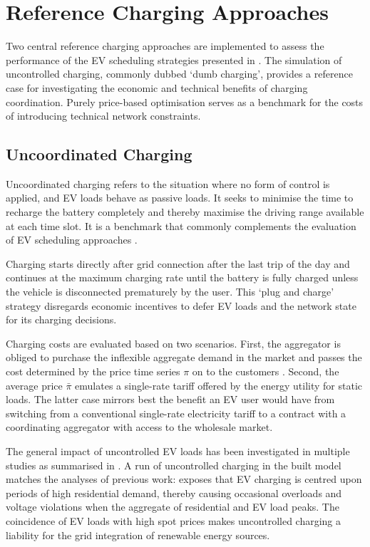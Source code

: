 \section{Reference Charging Approaches}
\label{sec:rc}

Two central reference charging approaches are implemented to assess the performance of the EV scheduling strategies presented in . The simulation of uncontrolled charging, commonly dubbed `dumb charging', provides a reference case for investigating the economic and technical benefits of charging coordination. Purely price-based optimisation serves as a benchmark for the costs of introducing technical network constraints.

\subsection{Uncoordinated Charging}
\label{sec:dumbcharging}

Uncoordinated charging refers to the situation where no form of control is applied, and EV loads behave as passive loads. It seeks to minimise the time to recharge the battery completely and thereby maximise the driving range available at each time slot. It is a benchmark that commonly complements the evaluation of EV scheduling approaches \cite{GonzalezVaya2015a, Galus2011, Papadopoulos2012, Wu2013, Schuller2013}.

Charging starts directly after grid connection after the last trip of the day and continues at the maximum charging rate until the battery is fully charged unless the vehicle is disconnected prematurely by the user. This `plug and charge' strategy disregards economic incentives to defer EV loads and the network state for its charging decisions.

Charging costs are evaluated based on two scenarios. First, the aggregator is obliged to purchase the inflexible aggregate demand in the market and passes the cost determined by the price time series $\pi$ on to the customers \cite{GonzalezVaya2015a}. Second, the average price $\bar{\pi}$ emulates a single-rate tariff offered by the energy utility for static loads. The latter case mirrors best the benefit an EV user would have from switching from a conventional single-rate electricity tariff to a contract with a coordinating aggregator with access to the wholesale market.

The general impact of uncontrolled EV loads has been investigated in multiple studies as summarised in  . A run of uncontrolled charging in the built model matches the analyses of previous work:  exposes that EV charging is centred upon periods of high residential demand, thereby causing occasional overloads and voltage violations when the aggregate of residential and EV load peaks. The coincidence of EV loads with high spot prices makes uncontrolled charging a liability for the grid integration of renewable energy sources.

